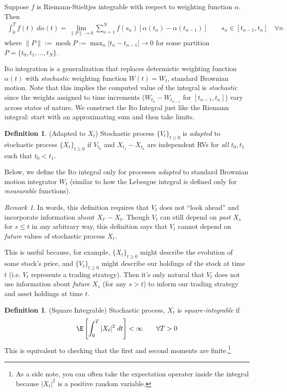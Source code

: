 \documentclass[12pt]{article}
\theoremstyle{plain}
\theoremstyle{definition}
\newtheorem{defn}[thm]{Definition}
\theoremstyle{remark}
\newtheorem*{rmk}{Remark}
\newcommand{\ra}{\rightarrow}
\newcommand{\mesh}{\operatorname{mesh}}
\newcommand{\sumnN}{\sum^N_{n=1}}
\begin{document}
Suppose $f$ is Riemann-Stieltjes integrable with respect to weighting
function $\alpha$. Then
\begin{align}
  \int_0^T f(t) \; d\alpha(t)
  = \lim_{\lVert P\rVert \ra 0} \sumnN
  f(s_n)[\alpha(t_n)-\alpha(t_{n-1})]
  \qquad s_n\in [t_{n-1},t_n]\quad\forall n
  \label{riemannstieltjes}
\end{align}
where $\lVert P\rVert:=\mesh P := \max_n |t_n-t_{n-1}|\ra0$ for some
partition $P = \{t_0, t_1,\ldots,t_N\}$.

Ito integration is a generalization that replaces determistic weighting
function $\alpha(t)$ with \emph{stochastic} weighting function
$W(t)=W_t$, standard Brownian motion. Note that this implies the
computed value of the integral is \emph{stochastic} since the weights
assigned to time increments ($W_{t_n}-W_{t_{n-1}}$ for $[t_{n-1},t_n]$)
vary across states of nature.  We construct the Ito Integral just like
the Riemann integral: start with an approximating sum and then take
limits.


\begin{defn}(Adapted to $X_t$)
Stochastic process $\{V_t\}_{t\geq 0}$ is \emph{adapted} to stochastic
process $\{X_t\}_{t\geq 0}$ if $V_{t_0}$ and $X_{t_1}-X_{t_0}$ are independent
RVs for \emph{all} $t_0,t_1$ such that $t_0<t_1$.

Below, we define the Ito integral only for processes \emph{adapted} to
standard Brownian motion integrator $W_t$ (similar to how the Lebesgue
integral is defined only for \emph{measurable} functions).
\end{defn}

\begin{rmk}
In words, this definition requires that $V_t$ does not ``look ahead''
and incorporate information about $X_{t'}-X_t$.
Though $V_t$ can still depend on \emph{past} $X_s$ for $s\leq t$ in any
arbitrary way, this definition says that $V_t$ cannot depend on
\emph{future} values of stochastic process $X_t$.

This is useful because, for example, $\{X_t\}_{t\geq 0}$ might describe
the evolution of some stock's price, and $\{V_t\}_{t\geq0}$ might
describe our holdings of the stock at time $t$ (i.e. $V_t$ represents a
trading strategy). Then it's only natural that $V_t$ does not use
information about \emph{future} $X_s$ (for any $s>t$) to inform our
trading strategy and asset holdings at time $t$.
\end{rmk}


\begin{defn}(Square Integrable)
Stochastic process, $X_t$ is \emph{square-integrable} if
\begin{align*}
   \E\left[ \int^T_0 |X_t|^2 \; dt \right] < \infty
   \qquad\forall T>0
\end{align*}
This is equivalent to checking that the first and second moments are
finite.\footnote{%
  As a side note, you can often take the expectation operater inside the
  integral because $|X_t|^2$ is a positive random variable.
}
\end{defn}
\end{document}
